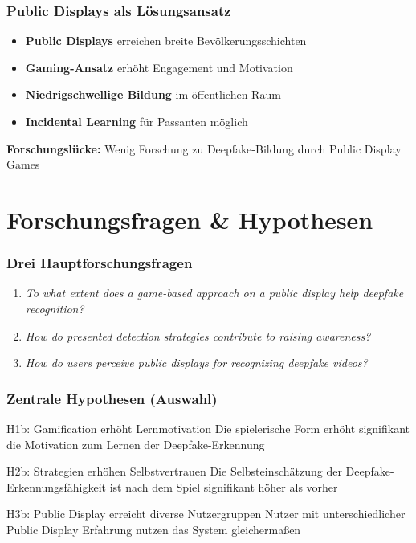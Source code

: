 \documentclass[aspectratio=169,t,xcolor=dvipsnames]{beamer}
\newcommand{\highlight}[1]{\textcolor{LMUBlue}{\textbf{#1}}}
\newcommand{\researchq}[1]{\textcolor{LMUGreen}{\textit{#1}}}
\begin{document}
\begin{frame}
\frametitle{Public Displays als Lösungsansatz}
\begin{itemize}
\item \highlight{Public Displays} erreichen breite Bevölkerungsschichten
\item \highlight{Gaming-Ansatz} erhöht Engagement und Motivation
\item \highlight{Niedrigschwellige Bildung} im öffentlichen Raum
\item \highlight{Incidental Learning} für Passanten möglich
\end{itemize}

\vspace{1em}
\begin{center}
\highlight{Forschungslücke:} Wenig Forschung zu Deepfake-Bildung durch Public Display Games
\end{center}
\end{frame}

\section{Forschungsfragen \& Hypothesen}

\begin{frame}
\frametitle{Drei Hauptforschungsfragen}
\begin{enumerate}
\item[\textcolor{LMUBlue}{\textbf{RQ1}}] \researchq{To what extent does a game-based approach on a public display help deepfake recognition?}

\item[\textcolor{LMUGreen}{\textbf{RQ2}}] \researchq{How do presented detection strategies contribute to raising awareness?}

\item[\textcolor{LMUGray}{\textbf{RQ3}}] \researchq{How do users perceive public displays for recognizing deepfake videos?}
\end{enumerate}
\end{frame}

\begin{frame}
\frametitle{Zentrale Hypothesen (Auswahl)}
\begin{block}{H1b: Gamification erhöht Lernmotivation}
Die spielerische Form erhöht signifikant die Motivation zum Lernen der Deepfake-Erkennung
\end{block}

\begin{block}{H2b: Strategien erhöhen Selbstvertrauen}
Die Selbsteinschätzung der Deepfake-Erkennungsfähigkeit ist nach dem Spiel signifikant höher als vorher
\end{block}

\begin{block}{H3b: Public Display erreicht diverse Nutzergruppen}
Nutzer mit unterschiedlicher Public Display Erfahrung nutzen das System gleichermaßen
\end{block}
\end{frame}
\end{document}
